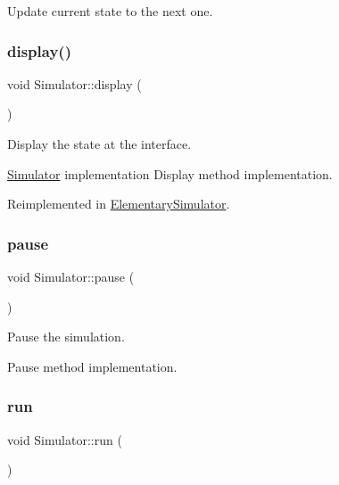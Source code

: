 Update current state to the next one. \mbox{\label{class_simulator_ae67f79cd49d6636f57761eec3b2656b5}} 
\subsubsection{\texorpdfstring{display()}{display()}}
{\footnotesize\ttfamily void Simulator\+::display (\begin{DoxyParamCaption}{ }\end{DoxyParamCaption})\hspace{0.3cm}{\ttfamily [virtual]}}

Display the state at the interface.

\mbox{\hyperlink{class_simulator}{Simulator}} implementation Display method implementation. 

Reimplemented in \mbox{\hyperlink{class_elementary_simulator_ac12315c72e09d7b96e6652db8867e39a}{Elementary\+Simulator}}.

\mbox{\label{class_simulator_ae98491fdcf683de0035e01d26cdbd00e}} 
\subsubsection{\texorpdfstring{pause}{pause}}
{\footnotesize\ttfamily void Simulator\+::pause (\begin{DoxyParamCaption}{ }\end{DoxyParamCaption})\hspace{0.3cm}{\ttfamily [slot]}}

Pause the simulation.

Pause method implementation. \mbox{\label{class_simulator_aa2de7e32b04cc3e8fc60aec23997621b}} 
\subsubsection{\texorpdfstring{run}{run}}
{\footnotesize\ttfamily void Simulator\+::run (\begin{DoxyParamCaption}{ }\end{DoxyParamCaption})\hspace{0.3cm}{\ttfamily [slot]}}

